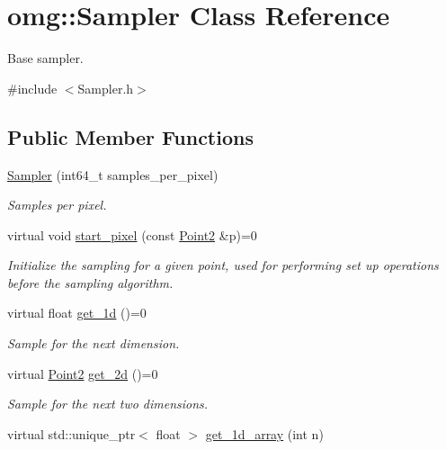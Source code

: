 \hypertarget{classomg_1_1_sampler}{}\section{omg\+::Sampler Class Reference}
\label{classomg_1_1_sampler}


Base sampler.  




{\ttfamily \#include $<$Sampler.\+h$>$}

\subsection*{Public Member Functions}
\begin{DoxyCompactItemize}
\item 
\mbox{\hyperlink{classomg_1_1_sampler_a6cf599ab70a735b2a352b20f35a0e2eb}{Sampler}} (int64\+\_\+t samples\+\_\+per\+\_\+pixel)
\begin{DoxyCompactList}\small\item\em Samples per pixel. \end{DoxyCompactList}\item 
virtual void \mbox{\hyperlink{classomg_1_1_sampler_aa4a2172276ec0bec3e717b7e035872d5}{start\+\_\+pixel}} (const \mbox{\hyperlink{namespaceomg_a18e42fb7bbc4159e9137145b866ec578}{Point2}} \&p)=0
\begin{DoxyCompactList}\small\item\em Initialize the sampling for a given point, used for performing set up operations before the sampling algorithm. \end{DoxyCompactList}\item 
virtual float \mbox{\hyperlink{classomg_1_1_sampler_ab577767afd5ef449d815493b81d8d7e0}{get\+\_\+1d}} ()=0
\begin{DoxyCompactList}\small\item\em Sample for the next dimension. \end{DoxyCompactList}\item 
virtual \mbox{\hyperlink{namespaceomg_a18e42fb7bbc4159e9137145b866ec578}{Point2}} \mbox{\hyperlink{classomg_1_1_sampler_a75c8c5ca9751d3c3c5ac025f3713bda0}{get\+\_\+2d}} ()=0
\begin{DoxyCompactList}\small\item\em Sample for the next two dimensions. \end{DoxyCompactList}\item 
virtual std\+::unique\+\_\+ptr$<$ float $>$ \mbox{\hyperlink{classomg_1_1_sampler_aeb4b5fa3758c26f2fc3307ce6f6e15f3}{get\+\_\+1d\+\_\+array}} (int n)

\end{DoxyCompactItemize}
